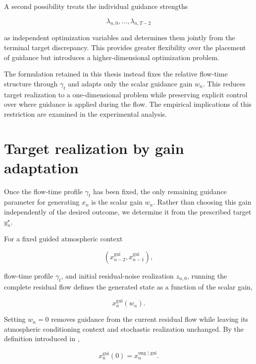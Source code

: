 A second possibility treats the individual guidance strengths

\[
    \lambda_{n,0},\ldots,\lambda_{n,T-2}
\]

as independent optimization variables and determines them jointly from the
terminal target discrepancy. This provides greater flexibility over the
placement of guidance but introduces a higher-dimensional optimization
problem.

The formulation retained in this thesis instead fixes the relative flow-time
structure through $\gamma_t$ and adapts only the scalar guidance gain $w_n$.
This reduces target realization to a one-dimensional problem while preserving
explicit control over where guidance is applied during the flow. The empirical
implications of this restriction are examined in the experimental analysis.

\section{Target realization by gain adaptation}
\label{sec:target-realization}

Once the flow-time profile $\gamma_t$ has been fixed, the only remaining
guidance parameter for generating $x_n$ is the scalar gain $w_n$. Rather than
choosing this gain independently of the desired outcome, we determine it from
the prescribed target $y_n^\star$.

For a fixed guided atmospheric context

\[
    \left(
        x_{n-2}^{\mathrm{gui}},
        x_{n-1}^{\mathrm{gui}}
    \right),
\]

flow-time profile $\gamma_t$, and initial residual-noise realization
$z_{n,0}$, running the complete residual flow defines the generated state as a
function of the scalar gain,

\begin{equation}
    x_n^{\mathrm{gui}}(w_n).
    \label{eq:guided-state-as-function-of-gain}
\end{equation}

Setting $w_n=0$ removes guidance from the current residual flow while leaving
its atmospheric conditioning context and stochastic realization unchanged.
By the definition introduced in ,

\begin{equation}
    x_n^{\mathrm{gui}}(0)
    =
    x_n^{\mathrm{ung}\mid\mathrm{gui}}.
    \label{eq:zero-gain-state}
\end{equation}

